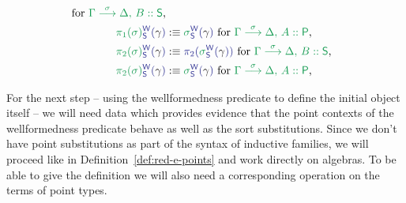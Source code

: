\begin{defn}
\begin{align*}
  \text{ for \grm{\IISub{\sigma}{\Gamma}{\Delta,\, B :: \Sc}},} \\
\tqm{\grm{\pi_1(\sigma)}^\WW_\Sc(\blgamma)}
  &:\equiv \tqm{\grm{\sigma}^\WW_\Sc(\blgamma)}
  \text{ for \grm{\IISub{\sigma}{\Gamma}{\Delta,\, A :: \Pc}},} \\
\tqm{\grm{\pi_2(\sigma)}^\WW_\Sc(\blgamma)}
  &:\equiv \tqm{\pi_2(\grm{\sigma}^\WW_\Sc(\blgamma))}
  \text{ for \grm{\IISub{\sigma}{\Gamma}{\Delta,\, B :: \Sc}},} \\
\tqm{\grm{\pi_2(\sigma)}^\WW_\Sc(\blgamma)}
  &:\equiv \tqm{\grm{\sigma}^\WW_\Sc(\blgamma)}
  \text{ for \grm{\IISub{\sigma}{\Gamma}{\Delta,\, A :: \Pc}},}
\end{align*}

For the next step -- using the wellformedness predicate to define the initial
object itself -- we will need data which provides evidence that the point contexts
of the wellformedness predicate behave as well as the sort substitutions.
Since we don't have point substitutions as part of the syntax of inductive
families, we will proceed like in Definition~\ref{def:red-e-points} and work
directly on algebras.
To be able to give the definition we will also need a corresponding operation
on the terms of point types.


\end{defn}
